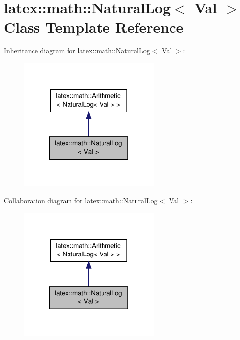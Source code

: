 \hypertarget{classlatex_1_1math_1_1NaturalLog}{\section{latex\-:\-:math\-:\-:Natural\-Log$<$ Val $>$ Class Template Reference}
\label{classlatex_1_1math_1_1NaturalLog}
}


Inheritance diagram for latex\-:\-:math\-:\-:Natural\-Log$<$ Val $>$\-:
\nopagebreak
\begin{figure}[H]
\begin{center}
\leavevmode
\includegraphics[width=198pt]{classlatex_1_1math_1_1NaturalLog__inherit__graph}
\end{center}
\end{figure}


Collaboration diagram for latex\-:\-:math\-:\-:Natural\-Log$<$ Val $>$\-:
\nopagebreak
\begin{figure}[H]
\begin{center}
\leavevmode
\includegraphics[width=198pt]{classlatex_1_1math_1_1NaturalLog__coll__graph}
\end{center}
\end{figure}
